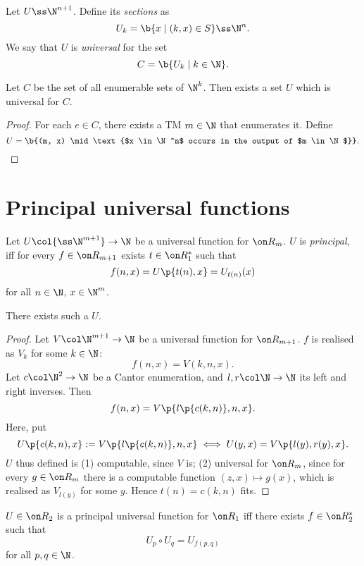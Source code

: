 \begin{definition}
  Let $U \ss \N^{n+1}$. Define its \emph{sections} as
  $$ U_k = \b{ x \mid (k, x) \in S} \ss \N^{n}. $$
  We say that $U$ is \emph{universal} for the set
  $$ C = \b{U_k \mid k \in \N}. $$
\end{definition}

\begin{lemma}
  Let $C$ be the set of all enumerable sets of $\N^k$.
  Then exists a set $U$ which is universal for $C$.
\end{lemma}

\begin{proof}
  For each $e \in C$, there exists a TM $m \in \N$ that enumerates it.
  Define
  $$ U = \b{(m, x) \mid \text{$x \in \N^n$ occurs in the output of $m \in \N$}}. $$
\end{proof}

\section{Principal universal functions}

\begin{definition}
  Let $U \col {\ss \N^{m+1}} \to \N$ be a universal function for $\Comp_m$.
  $U$ is \emph{principal}, iff for every $f \in \Comp_{m+1}$ exists $t \in \Comp_1^*$ such that
  $$ f(n, x) = U\p{t(n), x} = U_{t(n)}(x) $$
  for all $n \in \N$, $x  \in \N^m$.
\end{definition}

\begin{theorem}
  There exists such a $U$.  
\end{theorem}

\begin{proof}
  Let $V \col \N^{m+1} \to \N$ be a universal function for $\Comp_{m+1}$.
  $f$ is realised as $V_k$ for some $k \in \N$:
  $$ f(n, x) = V(k, n, x). $$
  Let $c \col \N^2 \to \N$ be a Cantor enumeration, and $l, r \col \N \to \N$ its left and right inverses.
  Then
  $$ f(n, x) = V\p{l\p{c(k, n)}, n, x}. $$
  Here, put
  $$ U\p{c(k, n), x} := V\p{l\p{c(k, n)}, n, x} \iff U(y, x) = V\p{l(y), r(y), x}. $$
  $U$ thus defined is (1) computable, since $V$ is; (2) universal for $\Comp_m$, since for every $g \in \Comp_m$ there is a computable function $(z, x) \mapsto g(x)$, which is realised as $V_{l(y)}$ for some $y$.
  Hence $t(n) = c(k, n)$ fits.
\end{proof}

\begin{lemma}
  $U \in \Comp_2$ is a principal universal function for $\Comp_1$
  iff there exists $f \in \Comp_2^*$ such that
  $$ U_p \circ U_q = U_{f(p, q)} $$
  for all $p,q \in \N$.  
\end{lemma}


